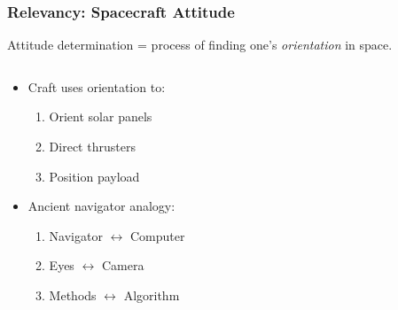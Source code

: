 \documentclass[11pt]{beamer}
\begin{document}
    \begin{frame}
        \frametitle{Relevancy: Spacecraft Attitude}
        \begin{definition}
            Attitude determination = process of finding one's \textit{orientation} in space.
        \end{definition} \medskip
        \begin{columns}
            \begin{column}{0.5\textwidth}
                \begin{itemize}
                    \item Craft uses orientation to: \medskip
                    \begin{enumerate}
                        \item Orient solar panels
                        \item Direct thrusters
                        \item Position payload
                    \end{enumerate} \medskip
                    \item Ancient navigator analogy: \medskip
                    \begin{enumerate}
                        \item Navigator $\leftrightarrow$ Computer
                        \item Eyes $\leftrightarrow$ Camera
                        \item Methods $\leftrightarrow$ Algorithm
                    \end{enumerate}
                \end{itemize}
            \end{column}
            \begin{column}{0.5\textwidth}
            \end{column}
        \end{columns}
    \end{frame}
\end{document}

